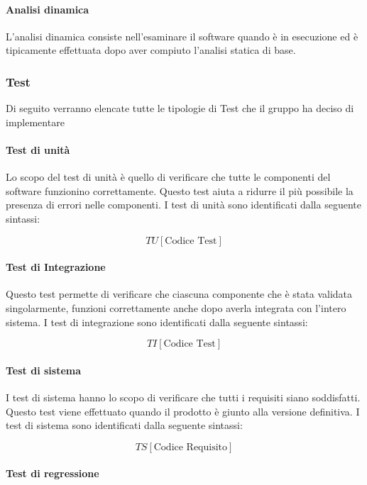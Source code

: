 \paragraph{Analisi dinamica }

L’analisi dinamica consiste nell’esaminare il software  quando è in esecuzione ed è tipicamente effettuata dopo aver compiuto l’analisi statica di base.

\subsubsection{Test}
Di seguito verranno elencate tutte le tipologie di Test che il gruppo ha deciso di implementare
\paragraph{Test di unità}

Lo scopo del test di unità è quello di verificare che tutte le componenti
del software funzionino correttamente. Questo test aiuta a ridurre il
più possibile la presenza di errori nelle componenti. 
I test di unità sono identificati dalla seguente sintassi:

$$ TU[\text{Codice Test}] $$

\paragraph{Test di Integrazione }

Questo test permette di verificare che ciascuna componente che è stata
validata singolarmente, funzioni correttamente anche dopo averla
integrata con l’intero sistema. I test di integrazione sono
identificati dalla seguente sintassi: 

$$ TI[\text{Codice Test}] $$

\paragraph{Test di sistema }

I test di sistema hanno lo scopo di verificare che tutti i requisiti
siano soddisfatti. Questo test viene effettuato quando il prodotto è
giunto alla versione definitiva. I test di sistema sono identificati
dalla seguente sintassi: 

$$ TS[\text{Codice Requisito}] $$

\paragraph{Test di regressione }

